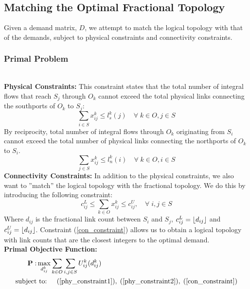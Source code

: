 \documentclass[sigconf]{acmart}
\begin{document}

\subsection{Matching the Optimal Fractional Topology}
Given a demand matrix, $D$, we attempt to match the logical topology with that of the demands, subject to physical constraints and connectivity constraints.
\subsubsection{Primal Problem}
\textbf{\\Physical Constraints: } This constraint states that the total number of integral flows that reach $S_j$ through $O_k$ cannot exceed the total physical links connecting the southports of $O_k$ to $S_j$:
\begin{equation}\label{phy_constraint1}
    \sum_{i \in S} x_{ij}^k \leq l_s^k(j) \quad \forall \; k \in O, j \in S
\end{equation}
By reciprocity, total number of integral flows through $O_k$ originating from $S_i$ cannot exceed the total number of physical links connecting the northports of $O_k$ to $S_i$.
\begin{equation}\label{phy_constraint2}
    \sum_{j \in S} x_{ij}^k \leq l_n^k(i) \quad \forall \; k \in O, i \in S
\end{equation}
\textbf{Connectivity Constraints: } In addition to the physical constraints, we also want to ''match'' the logical topology with the fractional topology. We do this by introducing the following constraint:
\begin{equation}\label{con_constraint}
    c_{ij}^L \leq \sum_{k \in O} x_{ij}^k \leq c_{ij}^U, \quad \forall \; i,j \in S
\end{equation}
Where $d_{ij}$ is the fractional link count between $S_i$ and $S_j$, $c_{ij}^L = \left\lfloor d_{ij} \right\rfloor$ and $c_{ij}^U = \left\lfloor d_{ij} \right\rfloor$. Constraint (\ref{con_constraint}) allows us to obtain a logical topology with link counts that are the closest integers to the optimal demand. \\
\textbf{Primal Objective Function: } %
\begin{equation}\label{primal_objective}
\begin{aligned}
    \mathbf{P: } & \max_{d_{ij}^k} \sum_{k \in O}\sum_{i, j \in S}U_{ij}^k(d^k_{ij})\\
     \text{subject} & \text{ to: } \quad (\ref{phy_constraint1}), \; (\ref{phy_constraint2}), \; (\ref{con_constraint})\\
\end{aligned}
\end{equation}
\end{document}
